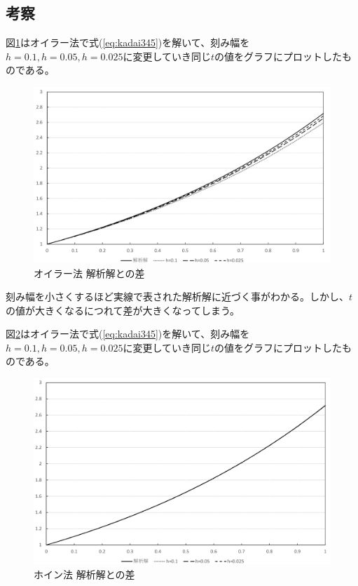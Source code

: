 \documentclass[10pt,titlepage]{jsarticle}
\begin{document}

\subsection{考察}
図\ref{fig:kadai3}はオイラー法で式(\ref{eq:kadai345})を解いて、刻み幅を$h=0.1,h=0.05,h=0.025$に変更していき同じ$t$の値をグラフにプロットしたものである。

\begin{figure}[H]
\centering
\includegraphics[width=12cm]{img/kadai3.png}
\caption{オイラー法  解析解との差}
\label{fig:kadai3}
\end{figure}

刻み幅を小さくするほど実線で表された解析解に近づく事がわかる。しかし、$t$の値が大きくなるにつれて差が大きくなってしまう。

図\ref{fig:kadai4}はオイラー法で式(\ref{eq:kadai345})を解いて、刻み幅を$h=0.1,h=0.05,h=0.025$に変更していき同じ$t$の値をグラフにプロットしたものである。

\begin{figure}[H]
\centering
\includegraphics[width=12cm]{img/kadai4.png}
\caption{ホイン法  解析解との差}
\label{fig:kadai4}
\end{figure}
\end{document}

